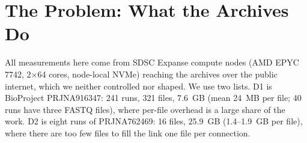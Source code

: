\documentclass[conference]{IEEEtran}
\begin{document}
\begin{table}[t]
\caption{Feature comparison at the versions benchmarked (read from each tool's help output, source and documentation).}\label{tab:feat}
\centering\scriptsize\setlength{\tabcolsep}{1.6pt}
\end{table}

\section{The Problem: What the Archives Do}\label{sec:problem}
All measurements here come from SDSC Expanse compute nodes (AMD EPYC 7742, 2$\times$64 cores, node-local NVMe) reaching the archives over the public internet, which we neither controlled nor shaped. We use two lists. D1 is BioProject PRJNA916347: 241 runs, 321 files, 7.6~GB (mean 24~MB per file; 40 runs have three FASTQ files), where per-file overhead is a large share of the work. D2 is eight runs of PRJNA762469: 16 files, 25.9~GB (1.4--1.9~GB per file), where there are too few files to fill the link one file per connection.
\end{document}
